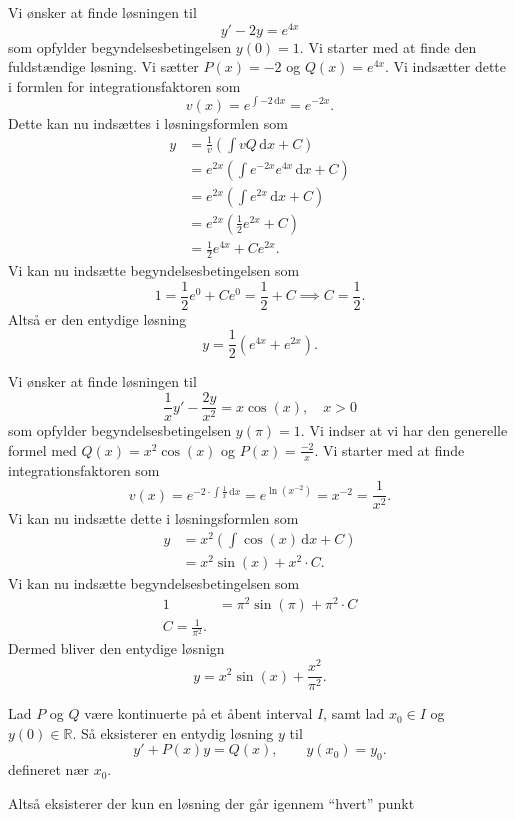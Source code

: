 \begin{eks} 
  Vi ønsker at finde løsningen til
  \[ 
  y' - 2y = e^{4x}
  \]
  som opfylder begyndelsesbetingelsen $y(0) = 1$.
  \bigbreak
  Vi starter med at finde den fuldstændige løsning. Vi sætter $P(x) = -2$ og $Q(x) = e^{4x}$. Vi indsætter dette i formlen for integrationsfaktoren som
  \[ 
  v(x) = e^{\int -2 \, \mathrm{d}x} = e^{-2x}
  .\]
  Dette kan nu indsættes i løsningsformlen som
  \begin{align*}
    y &= \frac{1}{v} \left( \int vQ \, \mathrm{d}x + C \right) \\
    &= e^{2x} \left( \int e^{-2x}e^{4x} \, \mathrm{d}x + C \right) \\
    &= e^{2x} \left( \int e^{2x} \, \mathrm{d}x + C \right) \\
    &= e^{2x} \left( \frac{1}{2}e^{2x} + C \right) \\
    &= \frac{1}{2}e^{4x} + Ce^{2x}
  .\end{align*}
  Vi kan nu indsætte begyndelsesbetingelsen som
  \[ 
  1 = \frac{1}{2}e^{0} + Ce^{0} = \frac{1}{2} + C \implies C = \frac{1}{2}
  .\]
  Altså er den entydige løsning
  \[ 
  y = \frac{1}{2} \left( e^{4x} + e^{2x} \right)
  .\]
\end{eks}

\begin{eks} 
  Vi ønsker at finde løsningen til 
  \[ 
  \frac{1}{x}y' - \frac{2y}{x^2} = x \cos(x), \quad x > 0
  \]
  som opfylder begyndelsesbetingelsen $y(\pi) = 1$.
  \bigbreak
  Vi indser at vi har den generelle formel med $Q(x) = x^2 \cos(x)$ og $P(x) = \frac{-2}{x}$. Vi starter med at finde integrationsfaktoren som
  \[ 
  v(x) = e^{-2 \cdot \int \frac{1}{x} \, \mathrm{d}x } = e^{\ln(x^{-2})} = x^{-2} = \frac{1}{x^2}
  .\]
  Vi kan nu indsætte dette i løsningsformlen som
  \begin{align*}
    y &= x^2 \left( \int \cos(x) \, \mathrm{d}x + C \right) \\
    &= x^2 \sin(x) + x^2\cdot C 
  .\end{align*}
  Vi kan nu indsætte begyndelsesbetingelsen som
  \begin{align*}
    1 &= \pi^2 \sin(\pi) + \pi^2 \cdot C \\
    C = \frac{1}{\pi^2}
  .\end{align*}
  Dermed bliver den entydige løsnign
  \[ 
  y = x^2 \sin(x) + \frac{x^2}{\pi^2}
  .\]
\end{eks}

\begin{sæt} 
  Lad $P$ og $Q$ være kontinuerte på et åbent interval $I$, samt lad $x_0 \in I$ og $y(0) \in \mathbb{R}$. Så eksisterer en entydig løsning $y$ til
  \[ 
  y' + P(x)y = Q(x), \qquad y(x_0) = y_0
  .\]
  defineret nær $x_0$.

  Altså eksisterer der kun en løsning der går igennem ``hvert'' punkt
\end{sæt}
